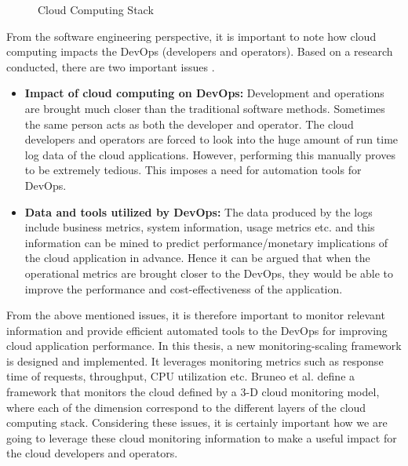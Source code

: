 \documentclass[article,type=msc,colorback,12pt,accentcolor=tud8b,table]{tudthesis}
\begin{document}
 \begin{figure}
 \begin{center}
  \makebox[\textwidth]{\texttt{[image: 1-1]}}
\end{center}
\caption{Cloud Computing Stack}
\label{fig:ccstack}
\end{figure}

%	
%	
%	
	
 From the software engineering perspective, it is important to note how cloud computing impacts the DevOps (developers and operators). Based on a research conducted, there are two important issues \cite{cito2015making}. 

\begin{itemize}
	\item \textbf{Impact of cloud computing on DevOps:}
	Development and operations are brought much closer than the traditional software methods. Sometimes the same person acts as both the developer and operator. The cloud developers and operators are forced to look into the huge amount of run time log data of the cloud applications. However, performing this manually proves to be extremely tedious. This imposes a need for automation tools for DevOps.
	
	\item \textbf{Data and tools utilized by DevOps:}
	The data produced by the logs include business metrics, system information, usage metrics etc. and this information can be mined to predict performance/monetary implications of the cloud application in advance. Hence it can be argued that when the operational metrics are brought closer to the DevOps, they would be able to improve the performance and cost-effectiveness of the application.
	
\end{itemize}
From the above mentioned issues, it is therefore important to monitor relevant information and provide efficient automated tools to the DevOps for improving cloud application performance. In this thesis, a new monitoring-scaling framework is designed and implemented. It leverages monitoring metrics such as response time of requests, throughput, CPU utilization etc. Bruneo et al.\cite{bruneo2015framework} define a framework that monitors the cloud defined by a 3-D cloud monitoring model, where each of the dimension correspond to the different layers of the cloud computing stack. Considering these issues, it is certainly important how we are going to leverage these cloud monitoring information to make a useful impact for the cloud developers and operators. 
 
\end{document}
